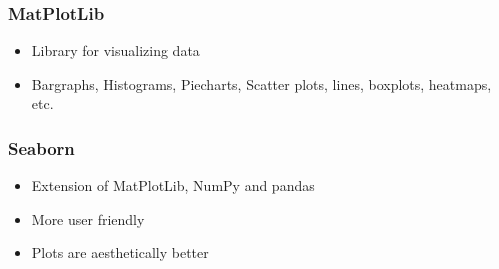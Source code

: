 \subsubsection{MatPlotLib}
\begin{itemize}
    \item Library for visualizing data
    \item Bargraphs, Histograms, Piecharts, Scatter plots, lines, boxplots, heatmaps, etc.
\end{itemize}

\subsubsection{Seaborn}
\begin{itemize}
    \item Extension of MatPlotLib, NumPy and pandas
    \item More user friendly
    \item Plots are aesthetically better
\end{itemize}

